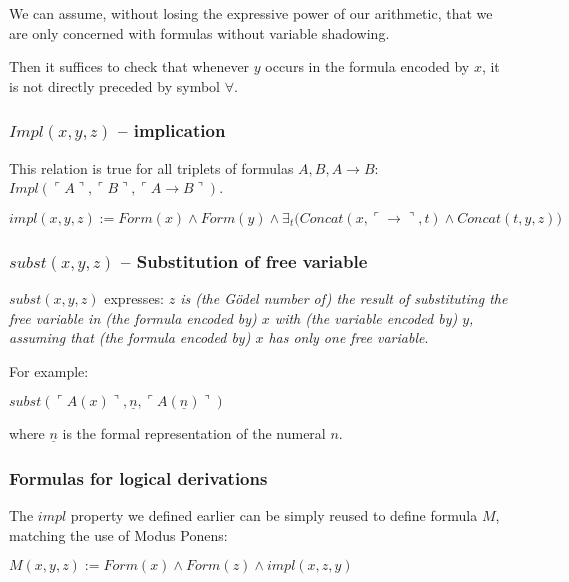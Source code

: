 \documentclass{article}
\begin{document}
We can assume, without losing the expressive power of our arithmetic, that we are only concerned with
formulas without variable shadowing.

Then it suffices to check that whenever $y$ occurs in the formula encoded by $x$, it is not directly preceded
by symbol $\forall$.

\subsubsection{$Impl(x, y, z)$ -- implication}

This relation is true for all triplets of formulas $A, B, A \rightarrow B$:
$Impl(\ulcorner A \urcorner, \ulcorner B \urcorner, \ulcorner A \rightarrow B \urcorner)$.

\begin{center}
    $impl(x, y, z) := Form(x) \land Form(y) \land \exists_t \bigl(
        Concat(x, \ulcorner \rightarrow \urcorner, t)
        \land
        Concat(t, y, z)
    \bigl)$
\end{center}

\subsubsection{$subst(x, y, z)$ -- Substitution of free variable}

$subst(x, y, z)$ expresses: \textit{$z$ is (the Gödel number of) the result of substituting the free variable
in (the formula encoded by) $x$ with (the variable encoded by) $y$, assuming that (the formula encoded by)
$x$ has only one free variable}.

For example:

\begin{center}
    $subst(\ulcorner A(x) \urcorner, \underline{n}, \ulcorner A(\underline{n}) \urcorner)$
\end{center}

where $\underline{n}$ is the formal representation of the numeral $n$.

\subsubsection{Formulas for logical derivations}

The $impl$ property we defined earlier can be simply reused to define formula $M$, matching the use
of Modus Ponens:

\begin{center}
    $M(x, y, z) := Form(x) \land Form(z) \land impl(x, z, y)$
\end{center}
\end{document}
